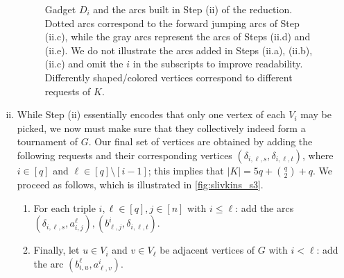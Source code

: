 \documentclass[a4paper,UKenglish,cleveref, autoref, thm-restate]{lipics-v2021}
\newcommand{\inners}{1.2pt}
\newcommand{\outers}{1pt}
\begin{document}
\begin{enumerate}[(i)]
\begin{figure}[!htb]
\begin{tikzpicture}[scale=1]
      \end{tikzpicture}
      \caption{Gadget $D_i$ and the arcs built in Step (ii) of the reduction. Dotted arcs
        correspond to the forward jumping arcs of Step (ii.c), while the gray arcs
        represent the arcs of Steps (ii.d) and (ii.e). We do not illustrate the arcs
        added in Steps (ii.a), (ii.b), (ii.c) and omit the $i$ in the subscripts to
        improve readability. Differently shaped/colored vertices correspond to different
      requests of $K$.\label{fig:slivkins_s2}}
    \end{figure}
  \item While Step (ii) essentially encodes that only one vertex of each $V_i$ may be
    picked, we now must make sure that they collectively indeed form a tournament of
    $G$. Our final set of vertices are obtained by adding the following requests and
    their corresponding vertices $(\delta_{i,\ell,s},
    \delta_{i,\ell,t})$, where $i \in [q]$ and $\ell \in [q] \setminus [i-1]$; this
    implies that $|K| = 5q + \binom{q}{2} + q$.
    We proceed as follows, which is illustrated in \autoref{fig:slivkins_s3}.
    \begin{enumerate}
      \item For each triple $i, \ell \in [q], j \in [n]$ with $i \leq \ell$: add the
        arcs $(\delta_{i,\ell,s}, a^\ell_{i,j}), (b^i_{\ell, j}, \delta_{i,\ell,t})$.
      \item Finally, let $u \in V_i$ and $v \in V_\ell$ be adjacent vertices of $G$
        with $i < \ell$: add the arc $(b^\ell_{i,u}, a^i_{\ell,v})$.
    \end{enumerate}

    \begin{figure}[!htb]
      \centering
\end{figure}
\end{enumerate}
\end{document}
